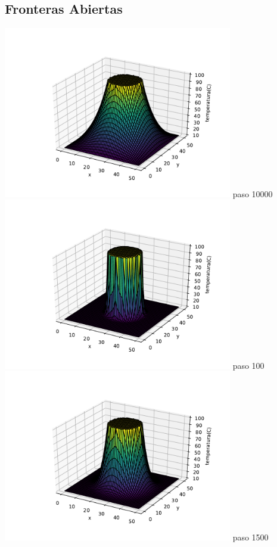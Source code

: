 \documentclass[12pt]{article}
\begin{document}
\begin{centering}
\subsection{Fronteras Abiertas}
\includegraphics[width=0.75\textwidth]{3d5.pdf}
paso 10000
\\
\includegraphics[width=0.75\textwidth]{3d6.pdf}
paso 100
\\
\includegraphics[width=0.75\textwidth]{3d7.pdf}
paso 1500

\end{centering}
\end{document}
